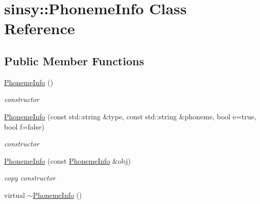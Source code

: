 \hypertarget{classsinsy_1_1PhonemeInfo}{\section{sinsy\-:\-:\-Phoneme\-Info \-Class \-Reference}
\label{classsinsy_1_1PhonemeInfo}
}
\subsection*{\-Public \-Member \-Functions}
\begin{DoxyCompactItemize}
\item 
\hypertarget{classsinsy_1_1PhonemeInfo_a617535e7cd483f0883798f0f021d9790}{\hyperlink{classsinsy_1_1PhonemeInfo_a617535e7cd483f0883798f0f021d9790}{\-Phoneme\-Info} ()}\label{classsinsy_1_1PhonemeInfo_a617535e7cd483f0883798f0f021d9790}

\begin{DoxyCompactList}\small\item\em constructor \end{DoxyCompactList}\item 
\hypertarget{classsinsy_1_1PhonemeInfo_ad5406034f30d9997184c58ff353247df}{\hyperlink{classsinsy_1_1PhonemeInfo_ad5406034f30d9997184c58ff353247df}{\-Phoneme\-Info} (const std\-::string \&type, const std\-::string \&phoneme, bool e=true, bool f=false)}\label{classsinsy_1_1PhonemeInfo_ad5406034f30d9997184c58ff353247df}

\begin{DoxyCompactList}\small\item\em constructor \end{DoxyCompactList}\item 
\hypertarget{classsinsy_1_1PhonemeInfo_a2b4622acacaf8d8ba80eb5a1d770baac}{\hyperlink{classsinsy_1_1PhonemeInfo_a2b4622acacaf8d8ba80eb5a1d770baac}{\-Phoneme\-Info} (const \hyperlink{classsinsy_1_1PhonemeInfo}{\-Phoneme\-Info} \&obj)}\label{classsinsy_1_1PhonemeInfo_a2b4622acacaf8d8ba80eb5a1d770baac}

\begin{DoxyCompactList}\small\item\em copy constructor \end{DoxyCompactList}\item 
\hypertarget{classsinsy_1_1PhonemeInfo_ae88e3093623dd8e7f59649ceb28ba8af}{virtual \hyperlink{classsinsy_1_1PhonemeInfo_ae88e3093623dd8e7f59649ceb28ba8af}{$\sim$\-Phoneme\-Info} ()}\label{classsinsy_1_1PhonemeInfo_ae88e3093623dd8e7f59649ceb28ba8af}


\end{DoxyCompactItemize}
